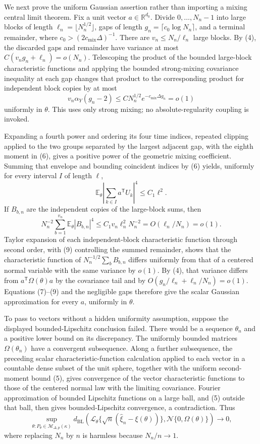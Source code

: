 We next prove the uniform Gaussian assertion rather than importing a mixing central limit theorem.  Fix a unit vector \(a\in\mathbb R^{d_0}\).  Divide \(0,\ldots,N_n-1\) into large blocks of length \(\ell_n=\lfloor N_n^{1/2}\rfloor\), gaps of length \(g_n=\lceil c_0\log N_n\rceil\), and a terminal remainder, where \(c_0>(2c_{\mathrm{mix}}\Delta)^{-1}\).  There are \(v_n\leq N_n/\ell_n\) large blocks.  By (4), the discarded gaps and remainder have variance at most \(C(v_ng_n+\ell_n)=o(N_n)\).  Telescoping the product of the bounded large-block characteristic functions and applying the bounded strong-mixing covariance inequality at each gap changes that product to the corresponding product for independent block copies by at most
\[
 v_n\alpha_Y(g_n-2)\leq C N_n^{1/2}e^{-c_{\mathrm{mix}}\Delta g_n}=o(1)
\tag{7}
\]
uniformly in \(\theta\).  This uses only strong mixing; no absolute-regularity coupling is invoked.

Expanding a fourth power and ordering its four time indices, repeated clipping applied to the two groups separated by the largest adjacent gap, with the eighth moment in (6), gives a positive power of the geometric mixing coefficient.  Summing that envelope and bounding coincident indices by (6) yields, uniformly for every interval \(I\) of length \(\ell\),
\[
 \mathbb E_\theta\left|\sum_{k\in I}a^{\mathsf T}U_k\right|^4\leq C_1\ell^2.
\tag{8}
\]
If \(B_{b,n}\) are the independent copies of the large-block sums, then
\[
 N_n^{-2}\sum_{b=1}^{v_n}\mathbb E_\theta|B_{b,n}|^4
 \leq C_1v_n\ell_n^2N_n^{-2}
 =O(\ell_n/N_n)=o(1).
\tag{9}
\]
Taylor expansion of each independent-block characteristic function through second order, with (9) controlling the summed remainder, shows that the characteristic function of \(N_n^{-1/2}\sum_bB_{b,n}\) differs uniformly from that of a centered normal variable with the same variance by \(o(1)\).  By (4), that variance differs from \(a^{\mathsf T}\Omega(\theta)a\) by the covariance tail and by \(O(g_n/\ell_n+\ell_n/N_n)=o(1)\).  Equations (7)--(9) and the negligible gaps therefore give the scalar Gaussian approximation for every \(a\), uniformly in \(\theta\).

To pass to vectors without a hidden uniformity assumption, suppose the displayed bounded-Lipschitz conclusion failed.  There would be a sequence \(\theta_n\) and a positive lower bound on its discrepancy.  The uniformly bounded matrices \(\Omega(\theta_n)\) have a convergent subsequence.  Along a further subsequence, the preceding scalar characteristic-function calculation applied to each vector in a countable dense subset of the unit sphere, together with the uniform second-moment bound (5), gives convergence of the vector characteristic functions to those of the centered normal law with the limiting covariance.  Fourier approximation of bounded Lipschitz functions on a large ball, and (5) outside that ball, then gives bounded-Lipschitz convergence, a contradiction.  Thus
\[
 \sup_{\theta:P_\theta\in\mathcal M_{\Delta,p}(\kappa)}
 d_{\mathrm{BL}}\!\left(
 \mathcal L_\theta\{\sqrt n(\widehat\xi_n-\xi(\theta))\},
 \mathcal N\{0,\Omega(\theta)\}\right)\longrightarrow0,
\tag{10}
\]
where replacing \(N_n\) by \(n\) is harmless because \(N_n/n\to1\).

